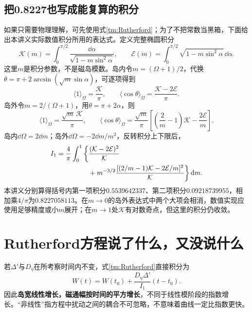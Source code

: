\subsection{把0.8227也写成能复算的积分}
如果只需要物理理解，可先使用式\eqref{tm:Rutherford}；为了不把常数当黑箱，下面给出本讲义实际数值积分所用的表达式。定义完整椭圆积分
\begin{equation}
 \mathcal K(m)=\int_0^{\pi/2}\frac{\dd\alpha}{\sqrt{1-m\sin^2\alpha}},
 \qquad
 \mathcal E(m)=\int_0^{\pi/2}\sqrt{1-m\sin^2\alpha}\,\dd\alpha.
\end{equation}
这里$m$是积分参数，不是磁岛模数。岛内令$m=(\Omega+1)/2$，代换
$\theta=\pi+2\arcsin(\sqrt m\sin\alpha)$，可逐项得到
\begin{equation}
 \langle1\rangle_\Omega=\frac{\mathcal K}{\pi},\qquad
 \langle\cos\theta\rangle_\Omega=\frac{\mathcal K-2\mathcal E}{\pi}.
\end{equation}
岛外令$m=2/(\Omega+1)$，用$\theta=\pi+2\alpha$，则
\begin{equation}
 \langle1\rangle_\Omega=\frac{\sqrt m\,\mathcal K}{\pi},\qquad
 \langle\cos\theta\rangle_\Omega=
 \frac{\sqrt m}{\pi}\left[\left(\frac2m-1\right)\mathcal K-\frac{2\mathcal E}{m}\right].
\end{equation}
岛内$\dd\Omega=2\dd m$；岛外$\dd\Omega=-2\dd m/m^2$，反转积分上下限后，
\begin{align}
 I_1=\frac4\pi\int_0^1\bigg\{
 &\frac{(\mathcal K-2\mathcal E)^2}{\mathcal K}\notag\\
 &+m^{-3/2}\frac{[(2/m-1)\mathcal K-2\mathcal E/m]^2}{\mathcal K}
 \bigg\}\,\mathrm d m.
 \label{tm:RutherfordIntegral}
\end{align}
本讲义分别算得括号内第一项积分$0.5539642337$、第二项积分$0.09218739955$，相加乘$4/\pi$为$0.8227058113$。在$m\to0$的岛外表达式中两个大项会相消，数值实现应使用足够精度或小$m$展开；在$m\to1$处$\mathcal K$有对数奇点，但这里的积分仍收敛。

\section{Rutherford方程说了什么，又没说什么}
若$\Delta'$与$D_\eta$在所考察时间内不变，式\eqref{tm:Rutherford}直接积分为
\begin{equation}
 W(t)=W(t_0)+\frac{D_\eta\Delta'}{I_1}(t-t_0).
\end{equation}
因此\textbf{岛宽线性增长，磁通幅按时间的平方增长}，不同于线性模阶段的指数增长。“非线性”指方程中扰动之间的耦合不可忽略，不意味着曲线一定比指数更快。


